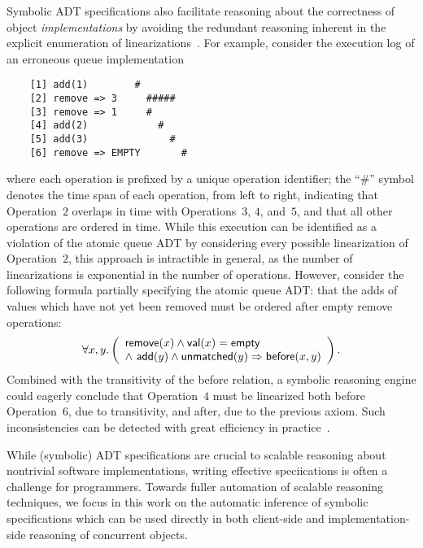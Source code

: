 Symbolic ADT specifications also facilitate reasoning about the correctness of
object \emph{implementations} by avoiding the redundant reasoning inherent in
the explicit enumeration of linearizations~\cite{conf/pldi/EmmiEH15}. For
example, consider the execution log of an erroneous queue implementation
\begin{verbatim}
    [1] add(1)        #
    [2] remove => 3     #####
    [3] remove => 1     #
    [4] add(2)            #
    [5] add(3)              #
    [6] remove => EMPTY       #
\end{verbatim}
where each operation is prefixed by a unique operation identifier; the “\#”
symbol denotes the time span of each operation, from left to right, indicating
that Operation~$2$ overlaps in time with Operations~$3$, $4$, and~$5$, and that
all other operations are ordered in time. While this execution can be identified
as a violation of the atomic queue ADT by considering every possible
linearization of Operation~$2$, this approach is intractible in general, as
the number of linearizations is exponential in the number of operations.
However, consider the following formula partially specifying the atomic
queue ADT: that the adds of values which have not yet been removed must be
ordered after empty remove operations:
\begin{align*}
  \forall x,y.\left(
    \begin{array}{l}
      {\sf remove}(x) \land {\sf val}(x) = {\sf empty} \\
      \land\ {\sf add}(y) \land {\sf unmatched}(y) \implies {\sf before}(x,y)
    \end{array}
  \right).
\end{align*}
Combined with the transitivity of the {\sf before} relation, a symbolic
reasoning engine could eagerly conclude that Operation~$4$ must be linearized
both before Operation~$6$, due to transitivity, and after, due to the previous
axiom. Such inconsistencies can be detected with great efficiency in
practice~\cite{conf/pldi/EmmiEH15}.

While (symbolic) ADT specifications are crucial to scalable reasoning about
nontrivial software implementations, writing effective speciications is often a
challenge for programmers. Towards fuller automation of scalable reasoning
techniques, we focus in this work on the automatic inference of symbolic
specifications which can be used directly in both client-side and
implementation-side reasoning of concurrent objects.
